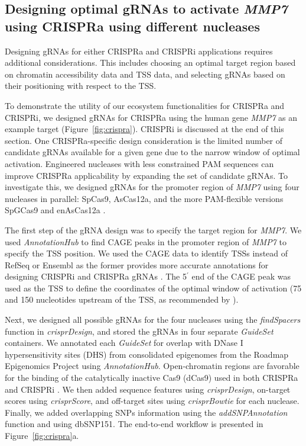 \documentclass[pdftex,english,10pt]{article}
\begin{document}
\subsection{Designing optimal gRNAs to activate \textit{MMP7} using CRISPRa using different nucleases}

Designing gRNAs for either CRISPRa and CRISPRi applications requires additional considerations. This includes choosing an optimal target region based on chromatin accessibility data and TSS data, and selecting gRNAs based on their positioning with respect to the TSS. 

To demonstrate the utility of our ecosystem functionalities for CRISPRa and CRISPRi, we designed gRNAs for CRISPRa using the human gene \textit{MMP7} as an example target (Figure~\ref{fig:crispra}). CRISPRi is discussed at the end of this section. One CRISPRa-specific design consideration is the limited number of candidate gRNAs available for a given gene due to the narrow window of optimal activation. 
Engineered nucleases with less constrained PAM sequences can improve CRISPRa applicability by expanding the set of candidate gRNAs. 
To investigate this, we designed gRNAs for the promoter region of \textit{MMP7} using four nucleases in parallel: SpCas9, AsCas12a, and the more PAM-flexible versions SpGCas9 \citep{spg} and enAsCas12a \citep{enpamgb}. 

The first step of the gRNA design was to specify the target region for \textit{MMP7}. 
We used \textit{AnnotationHub} to find CAGE peaks in the promoter region of \textit{MMP7} to specify the TSS position. We used the CAGE data to identify TSSs instead of RefSeq or Ensembl as the former provides more accurate annotations for designing CRISPRi and CRISPRa gRNAs \citep{radzisheuskaya2016optimizing}.
The 5$^\prime$ end of the CAGE peak was used as the TSS to define the coordinates of the optimal window of activation (75 and 150 nucleotides upstream of the TSS, as recommended by \citet{sanson2018optimized}). 

Next, we designed all possible gRNAs for the four nucleases using the \textit{findSpacers} function in \textit{crisprDesign}, and stored the gRNAs in four separate \textit{GuideSet} containers. We annotated each \textit{GuideSet} for overlap with DNase I hypersensitivity sites (DHS) from consolidated epigenomes from the Roadmap Epigenomics Project \citep{kundaje2015integrative} using \textit{AnnotationHub}. Open-chromatin regions are favorable for the binding of the catalytically inactive Cas9 (dCas9) used in both CRISPRa and CRISPRi \citep{kuscu2014genome,wu2014genome}. We then added sequence features using \textit{crisprDesign}, on-target scores using \textit{crisprScore}, and off-target sites using \textit{crisprBowtie} for each nuclease. Finally, we added overlapping SNPs information using the \textit{addSNPAnnotation} function and using dbSNP151. The end-to-end workflow is presented in Figure~\ref{fig:crispra}a.
\end{document}
